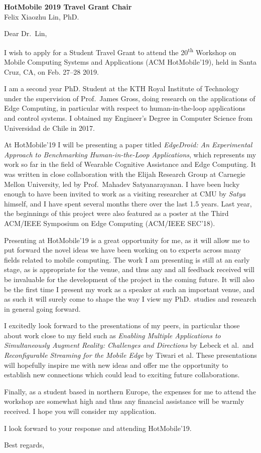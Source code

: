 \documentclass[english, 9pt]{kthletter}
\date{Stockholm, \today}
\begin{document}
\begin{letter}%
  {\textbf{HotMobile 2019 Travel Grant Chair}\\Felix Xiaozhu Lin, PhD.}
\opening{Dear Dr.~Lin,}

I wish to apply for a Student Travel Grant to attend the 20\textsuperscript{th} Workshop on Mobile Computing Systems and Applications (ACM HotMobile'19), held in Santa Cruz, CA, on Feb. 27--28 2019.

I am a second year PhD. Student at the KTH Royal Institute of Technology under the supervision of Prof.\ James Gross, doing research on the applications of Edge Computing, in particular with respect to human-in-the-loop applications and control systems.
I obtained my Engineer's Degree in Computer Science from Universidad de Chile in 2017.

At HotMobile'19 I will be presenting a paper titled \emph{EdgeDroid: An Experimental Approach to Benchmarking Human-in-the-Loop Applications}, which represents my work so far in the field of Wearable Cognitive Assistance and Edge Computing.
It was written in close collaboration with the Elijah Research Group at Carnegie Mellon University, led by Prof.\ Mahadev Satyanarayanan.
I have been lucky enough to have been invited to work as a visiting researcher at CMU by \emph{Satya} himself, and I have spent several months there over the last 1.5 years.
Last year, the beginnings of this project were also featured as a poster at the Third ACM/IEEE Symposium on Edge Computing (ACM/IEEE SEC'18).

Presenting at HotMobile'19 is a great opportunity for me, as it will allow me to put forward the novel ideas we have been working on to experts across many fields related to mobile computing.
The work I am presenting is still at an early stage, as is appropriate for the venue, and thus any and all feedback received will be invaluable for the development of the project in the coming future. It will also be the first time I present my work as a speaker at such an important venue, and as such it will surely come to shape the way I view my PhD.\ studies and research in general going forward.

I excitedly look forward to the presentations of my peers, in particular those about work close to my field such as \emph{Enabling Multiple Applications to Simultaneously Augment Reality: Challenges and Directions} by Lebeck et al.\ and \emph{Reconfigurable Streaming for the Mobile Edge} by Tiwari et al.
These presentations will hopefully inspire me with new ideas and offer me the opportunity to establish new connections which could lead to exciting future collaborations.

Finally, as a student based in northern Europe, the expenses for me to attend the workshop are somewhat high and thus any financial assistance will be warmly received.
I hope you will consider my application.

I look forward to your response and attending HotMobile'19.

\closing{Best regards,}

\end{letter}
\end{document}
